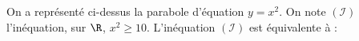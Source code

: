 
\hfill\begin{GraphiqueTikz}[x=0.5cm,y=0.125cm,Xmin=-4.5,Xmax=4.5,Ymin=-1,Ymax=20]
\end{GraphiqueTikz}\hfill\null

\smallskip

On a représenté ci-dessus la parabole d'équation $y = x^{2}$. On note $(\mathcal{I})$ l'inéquation, sur $\R$, $x^{2} \geqslant 10$. L'inéquation $(\mathcal{I})$ est équivalente à :

\smallskip

